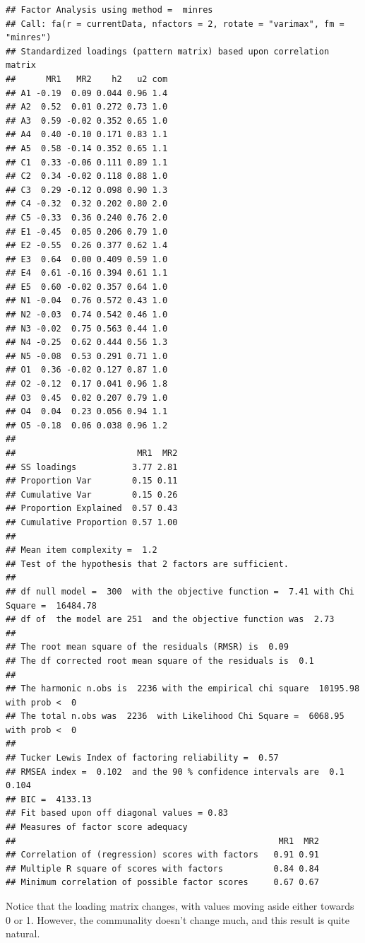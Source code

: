 \documentclass[
]{ctexart}
\begin{document}
\begin{verbatim}
## Factor Analysis using method =  minres
## Call: fa(r = currentData, nfactors = 2, rotate = "varimax", fm = "minres")
## Standardized loadings (pattern matrix) based upon correlation matrix
##      MR1   MR2    h2   u2 com
## A1 -0.19  0.09 0.044 0.96 1.4
## A2  0.52  0.01 0.272 0.73 1.0
## A3  0.59 -0.02 0.352 0.65 1.0
## A4  0.40 -0.10 0.171 0.83 1.1
## A5  0.58 -0.14 0.352 0.65 1.1
## C1  0.33 -0.06 0.111 0.89 1.1
## C2  0.34 -0.02 0.118 0.88 1.0
## C3  0.29 -0.12 0.098 0.90 1.3
## C4 -0.32  0.32 0.202 0.80 2.0
## C5 -0.33  0.36 0.240 0.76 2.0
## E1 -0.45  0.05 0.206 0.79 1.0
## E2 -0.55  0.26 0.377 0.62 1.4
## E3  0.64  0.00 0.409 0.59 1.0
## E4  0.61 -0.16 0.394 0.61 1.1
## E5  0.60 -0.02 0.357 0.64 1.0
## N1 -0.04  0.76 0.572 0.43 1.0
## N2 -0.03  0.74 0.542 0.46 1.0
## N3 -0.02  0.75 0.563 0.44 1.0
## N4 -0.25  0.62 0.444 0.56 1.3
## N5 -0.08  0.53 0.291 0.71 1.0
## O1  0.36 -0.02 0.127 0.87 1.0
## O2 -0.12  0.17 0.041 0.96 1.8
## O3  0.45  0.02 0.207 0.79 1.0
## O4  0.04  0.23 0.056 0.94 1.1
## O5 -0.18  0.06 0.038 0.96 1.2
## 
##                        MR1  MR2
## SS loadings           3.77 2.81
## Proportion Var        0.15 0.11
## Cumulative Var        0.15 0.26
## Proportion Explained  0.57 0.43
## Cumulative Proportion 0.57 1.00
## 
## Mean item complexity =  1.2
## Test of the hypothesis that 2 factors are sufficient.
## 
## df null model =  300  with the objective function =  7.41 with Chi Square =  16484.78
## df of  the model are 251  and the objective function was  2.73 
## 
## The root mean square of the residuals (RMSR) is  0.09 
## The df corrected root mean square of the residuals is  0.1 
## 
## The harmonic n.obs is  2236 with the empirical chi square  10195.98  with prob <  0 
## The total n.obs was  2236  with Likelihood Chi Square =  6068.95  with prob <  0 
## 
## Tucker Lewis Index of factoring reliability =  0.57
## RMSEA index =  0.102  and the 90 % confidence intervals are  0.1 0.104
## BIC =  4133.13
## Fit based upon off diagonal values = 0.83
## Measures of factor score adequacy             
##                                                    MR1  MR2
## Correlation of (regression) scores with factors   0.91 0.91
## Multiple R square of scores with factors          0.84 0.84
## Minimum correlation of possible factor scores     0.67 0.67
\end{verbatim}

Notice that the loading matrix changes, with values moving aside either
towards 0 or 1. However, the communality doesn't change much, and this
result is quite natural.
\end{document}
